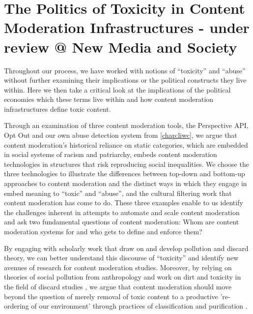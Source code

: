 \ifpdf
    \graphicspath{{Chapter9/Figs/Raster/}{Chapter9/Figs/PDF/}{Chapter9/Figs/}}
\else
    \graphicspath{{Chapter9/Figs/Vector/}{Chapter9/Figs/}}
\fi

\chapter{The Politics of Toxicity in Content Moderation Infrastructures - under review @ New Media and Society}\label{chap:filter}

Throughout our process, we have worked with notions of ``toxicity'' and ``abuse'' without further examining their implications or the political constructs they live within. Here we then take a critical look at the implications of the political economies which these terms live within and how content moderation infrastructures define toxic content.

Through an examination of three content moderation tools, the Perspective API, Opt Out and our own abuse detection system from \autoref{chap:liwc}, we argue that content moderation's historical reliance on static categories, which are embedded in social systems of racism and patriarchy, embeds content moderation technologies in structures that risk reproducing social inequalities. We choose the three technologies to illustrate the differences between top-down and bottom-up approaches to content moderation and the distinct ways in which they engage in embed meaning to ``toxic'' and ``abuse'', and the cultural filtering work that content moderation has come to do. These three examples enable to us identify the challenges inherent in attempts to automate and scale content moderation and ask two fundamental questions of content moderation: Whom are content moderation systems for and who gets to define and enforce them?

By engaging with scholarly work that draw on and develop pollution and discard theory, we can better understand this discourse of ``toxicity'' and identify new avenues of research for content moderation studies. Moreover, by relying on theories of social pollution from anthropology \cite{Douglas:1966} and work on dirt and toxicity in the field of discard studies \cite{Libeoiron:2018,Lepawsky:2019}, we argue that content moderation should move beyond the question of merely removal of toxic content to a productive 're-ordering of our environment' through practices of classification and purification \cite{Douglas:1966}.

